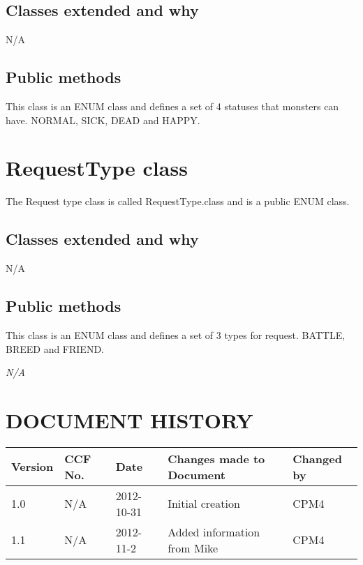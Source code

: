 \documentclass{project}
\begin{document}
\subsection{Classes extended and why}
N/A
\subsection{Public methods}
This class is an ENUM class and defines a set of 4 statuses that monsters can have. NORMAL, SICK, DEAD and HAPPY.


\section{RequestType class}
The Request type class is called RequestType.class and is a public ENUM class.
\subsection{Classes extended and why}
N/A
\subsection{Public methods}
This class is an ENUM class and defines a set of 3 types for request. BATTLE, BREED and FRIEND. 




\clearpage
{}
\begin{thebibliography}{5}
\bibitem{} \emph{N/A}
\end{thebibliography}
\clearpage
{}
\section*{DOCUMENT HISTORY}
\begin{tabular}{|l | l | l | l | l |}
\hline
Version & CCF No. & Date & Changes made to Document & Changed by \\
\hline
1.0 & N/A & 2012-10-31 & Initial creation & CPM4 \\
\hline
1.1 & N/A & 2012-11-2 & Added information from Mike & CPM4 \\
\hline
\end{tabular}
\label{thelastpage}
\end{document}
